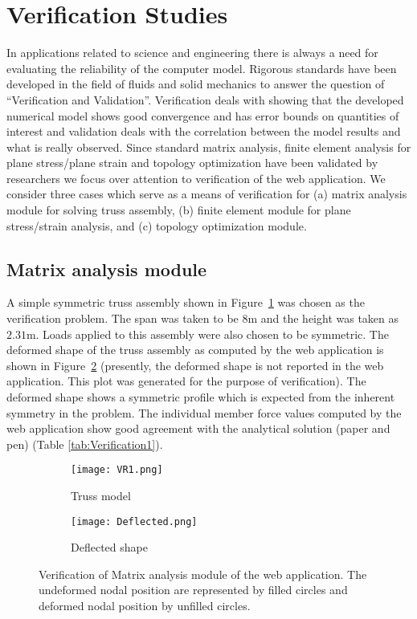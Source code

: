 \documentclass[preprint]{elsarticle}
\begin{document}
\section{Verification Studies} 
\label{Ref}
In applications related to science and engineering there is always a need for
evaluating the reliability of the computer model. Rigorous standards have been
developed in the field of fluids and solid mechanics to answer the question of
``Verification and Validation''. Verification deals with showing
that the developed numerical model shows good convergence and has error bounds
on quantities of interest and validation deals with the correlation between the
model results and what is really observed. Since standard matrix analysis,
finite element analysis for plane stress/plane strain and topology optimization
have been validated by researchers we focus over attention to verification of
the web application. We consider three cases which serve as a means of verification 
for (a) matrix analysis module for solving truss assembly, (b) finite element
module for plane stress/strain analysis, and (c) topology optimization module.

\subsection{Matrix analysis module}
A simple symmetric truss assembly shown in Figure~\ref{fig:Verification1} was
chosen as the verification problem. The span was taken to be $8$m and the height
was taken as $2.31$m. Loads applied to this assembly were also chosen to be
symmetric.
The deformed shape of the truss assembly as computed by the web application is
shown in Figure~\ref{fig:Verification1deformation} (presently, the deformed
shape is not reported in the web application. This plot was generated for the
purpose of verification). The deformed shape shows a symmetric profile which is
expected from the inherent symmetry in the problem. The individual member force
values computed by the web application show good agreement with the analytical
solution (paper and pen) (Table \ref{tab:Verification1}).

\begin{figure*}[!h]
    \centering
    \begin{subfigure}{0.475\textwidth}
        \texttt{[image: VR1.png]}
        \caption{Truss model}
        \label{fig:Verification1}
    \end{subfigure}
\begin{subfigure}{0.475\textwidth}
        \texttt{[image: Deflected.png]}
        \caption{Deflected shape}
        \label{fig:Verification1deformation}
    \end{subfigure}
\caption{Verification of Matrix analysis module of the web application. The undeformed nodal position are represented by filled circles and deformed nodal position by unfilled circles.}
\label{fig:Verification}
\end{figure*}
\end{document}
